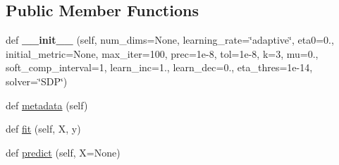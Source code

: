 \subsection*{Public Member Functions}
\begin{DoxyCompactItemize}
\item 
def {\bfseries \+\_\+\+\_\+init\+\_\+\+\_\+} (self, num\+\_\+dims=None, learning\+\_\+rate=\char`\"{}adaptive\char`\"{}, eta0=0., initial\+\_\+metric=None, max\+\_\+iter=100, prec=1e-\/8, tol=1e-\/8, k=3, mu=0., soft\+\_\+comp\+\_\+interval=1, learn\+\_\+inc=1., learn\+\_\+dec=0., eta\+\_\+thres=1e-\/14, solver=\char`\"{}\+S\+D\+P\char`\"{})\hypertarget{classdml_1_1lmnn_1_1LMNN_ab2ab17715d79b9c53b7a414fc8d7a347}{}\label{classdml_1_1lmnn_1_1LMNN_ab2ab17715d79b9c53b7a414fc8d7a347}

\item 
def \hyperlink{classdml_1_1lmnn_1_1LMNN_a112eee35ecdb3476172f4ac4ad2a4c40}{metadata} (self)
\item 
def \hyperlink{classdml_1_1lmnn_1_1LMNN_ac69c9741352a38851e85172b25766af6}{fit} (self, X, y)
\item 
def \hyperlink{classdml_1_1lmnn_1_1LMNN_a06e4bb50c7f50b7e6bac689743198b32}{predict} (self, X=None)
\end{DoxyCompactItemize}
